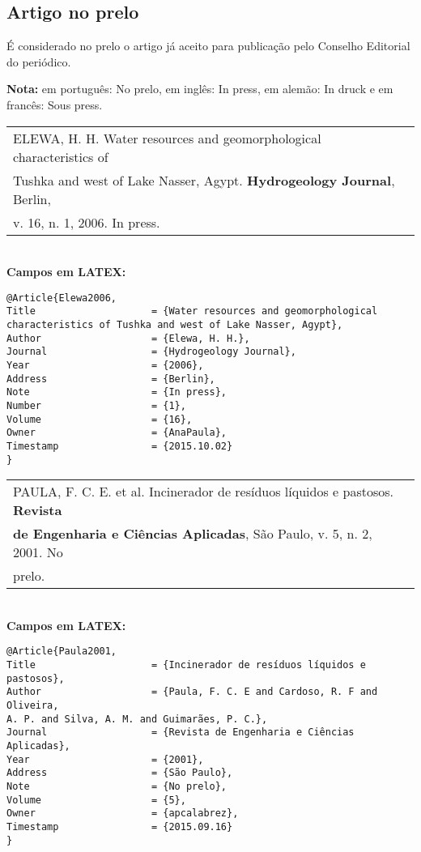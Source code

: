 \subsection{Artigo no prelo}

É considerado no prelo o artigo já aceito para publicação pelo Conselho
Editorial do periódico.

\textbf{Nota:} em português: No prelo, em inglês: In press, em alemão: In druck
e em francês: Sous press. 

\begin{tabular}{|l|c|} \hline
ELEWA, H. H. Water resources and geomorphological characteristics of
\\Tushka and west of Lake Nasser, Agypt. \textbf{Hydrogeology Journal}, Berlin,
\\v. 16, n. 1, 2006. In press. \\\hline
\end{tabular} \\

\textbf{Campos em LATEX:} 

\begin{verbatim}
@Article{Elewa2006,
Title                    = {Water resources and geomorphological 
characteristics of Tushka and west of Lake Nasser, Agypt},
Author                   = {Elewa, H. H.},
Journal                  = {Hydrogeology Journal},
Year                     = {2006},
Address                  = {Berlin},
Note                     = {In press},
Number                   = {1},
Volume                   = {16},
Owner                    = {AnaPaula},
Timestamp                = {2015.10.02}
}
\end{verbatim}

\begin{tabular}{|l|c|} \hline
PAULA, F. C. E. et al. Incinerador de resíduos líquidos e pastosos.
\textbf{Revista} \\ \textbf{ de Engenharia e Ciências Aplicadas}, São Paulo, v. 5, n. 2,
2001. No \\prelo. \\\hline
\end{tabular} \\

\textbf{Campos em LATEX:} 

\begin{verbatim}
@Article{Paula2001,
Title                    = {Incinerador de resíduos líquidos e pastosos},
Author                   = {Paula, F. C. E and Cardoso, R. F and Oliveira, 
A. P. and Silva, A. M. and Guimarães, P. C.},
Journal                  = {Revista de Engenharia e Ciências Aplicadas},
Year                     = {2001},
Address                  = {São Paulo},
Note                     = {No prelo},
Volume                   = {5},
Owner                    = {apcalabrez},
Timestamp                = {2015.09.16}
}
\end{verbatim}

